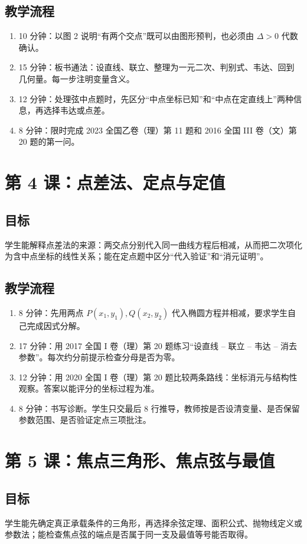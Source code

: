 \documentclass[UTF8,a4paper,11pt]{ctexart}
\newcommand{\lesson}[1]{\section{#1}}
\begin{document}
\subsection*{教学流程}
\begin{enumerate}
  \item 10 分钟：以图 2 说明“有两个交点”既可以由图形预判，也必须由 $\Delta>0$ 代数确认。
  \item 15 分钟：板书通法：设直线、联立、整理为一元二次、判别式、韦达、回到几何量。每一步注明变量含义。
  \item 12 分钟：处理弦中点题时，先区分“中点坐标已知”和“中点在定直线上”两种信息，再选择韦达或点差。
  \item 8 分钟：限时完成 2023 全国乙卷（理）第 11 题和 2016 全国 III 卷（文）第 20 题的第一问。
\end{enumerate}

\lesson{第 4 课：点差法、定点与定值}
\subsection*{目标}
学生能解释点差法的来源：两交点分别代入同一曲线方程后相减，从而把二次项化为含中点坐标的线性关系；能在定点题中区分“代入验证”和“消元证明”。

\subsection*{教学流程}
\begin{enumerate}
  \item 8 分钟：先用两点 $P(x_1,y_1),Q(x_2,y_2)$ 代入椭圆方程并相减，要求学生自己完成因式分解。
  \item 17 分钟：用 2017 全国 I 卷（理）第 20 题练习“设直线 -- 联立 -- 韦达 -- 消去参数”。每次约分前提示检查分母是否为零。
  \item 12 分钟：用 2020 全国 I 卷（理）第 20 题比较两条路线：坐标消元与结构性观察。答案以能评分的坐标过程为准。
  \item 8 分钟：书写诊断。学生只交最后 8 行推导，教师按是否设清变量、是否保留参数范围、是否验证定点三项批注。
\end{enumerate}

\lesson{第 5 课：焦点三角形、焦点弦与最值}
\subsection*{目标}
学生能先确定真正承载条件的三角形，再选择余弦定理、面积公式、抛物线定义或参数法；能检查焦点弦的端点是否属于同一支及最值等号能否取得。
\end{document}
